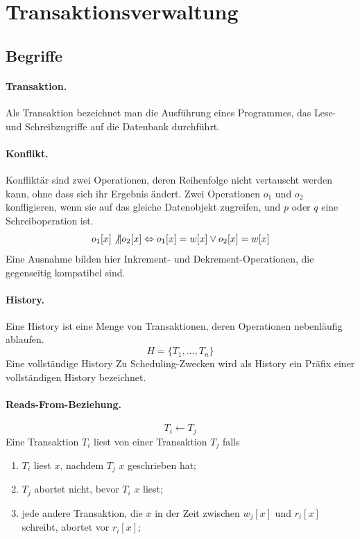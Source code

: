 \documentclass[]{scrartcl}
\begin{document}
\section{Transaktionsverwaltung}

\subsection{Begriffe}

\paragraph{Transaktion.} Als Transaktion bezeichnet man die Ausf\"uhrung eines Programmes, das Lese- und Schreibzugriffe auf die Datenbank durchf\"uhrt.

\paragraph{Konflikt.} Konflikt\"ar sind zwei Operationen, deren Reihenfolge nicht vertauscht werden kann, ohne dass sich ihr Ergebnis \"andert. Zwei Operationen $o_{1}$ und $o_{2}$ konfligieren, wenn sie auf das gleiche Datenobjekt zugreifen, und $p$ oder $q$ eine Schreiboperation ist. 
$$ o_{1}[x] \not \| o_{2}[x] \Leftrightarrow o_{1}[x] = w[x] \vee o_{2}[x] = w[x]$$
Eine Ausnahme bilden hier Inkrement- und Dekrement-Operationen, die gegenseitig kompatibel sind.


\paragraph{History.} Eine History ist eine Menge von Transaktionen, deren Operationen nebenl\"aufig ablaufen.
$$H = \{ T_{1}, \dots, T_{n} \}$$
Eine vollst\"andige History
Zu Scheduling-Zwecken wird als History ein Pr\"afix einer vollst\"andigen History bezeichnet.

\paragraph{Reads-From-Beziehung.}
$$T_{i} \gets T_{j}$$
Eine Transaktion $T_{i}$ liest von einer Transaktion $T_{j}$ falls
\begin{enumerate}
\item $T_{i}$ liest $x$, nachdem $T_{j}$ $x$ geschrieben hat;
\item $T_{j}$ abortet nicht, bevor $T_{i}$ $x$ liest;
\item jede andere Transaktion, die $x$ in der Zeit zwischen $w_{j}[x]$ und $r_{i}[x]$ schreibt, abortet vor $r_{i}[x]$;
\end{enumerate}
\end{document}
